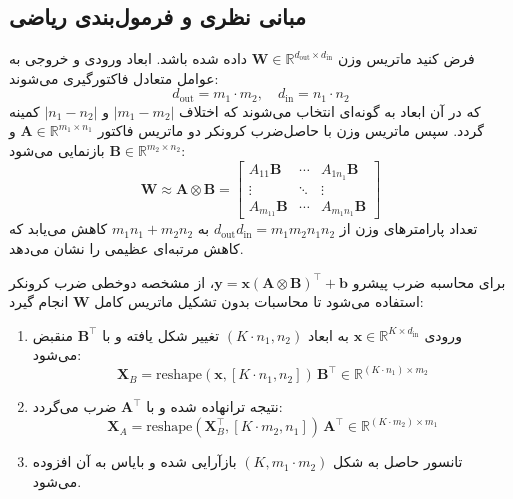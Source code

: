 \subsection{مبانی نظری و فرمول‌بندی ریاضی}
فرض کنید ماتریس وزن $\mathbf{W} \in \mathbb{R}^{d_{\text{out}} \times d_{\text{in}}}$ داده شده باشد. ابعاد ورودی و خروجی به عوامل متعادل فاکتورگیری می‌شوند:
\begin{equation}
d_{\text{out}} = m_1 \cdot m_2, \quad d_{\text{in}} = n_1 \cdot n_2
\end{equation}
که در آن ابعاد به گونه‌ای انتخاب می‌شوند که اختلاف $|m_1 - m_2|$ و $|n_1 - n_2|$ کمینه گردد. سپس ماتریس وزن با حاصل‌ضرب کرونکر دو ماتریس فاکتور $\mathbf{A} \in \mathbb{R}^{m_1 \times n_1}$ و $\mathbf{B} \in \mathbb{R}^{m_2 \times n_2}$ بازنمایی می‌شود:
\begin{equation}
\mathbf{W} \approx \mathbf{A} \otimes \mathbf{B} = \begin{bmatrix} 
A_{11}\mathbf{B} & \cdots & A_{1n_1}\mathbf{B} \\ 
\vdots & \ddots & \vdots \\ 
A_{m_11}\mathbf{B} & \cdots & A_{m_1n_1}\mathbf{B} 
\end{bmatrix}
\end{equation}
تعداد پارامترهای وزن از $d_{\text{out}} d_{\text{in}} = m_1 m_2 n_1 n_2$ به $m_1 n_1 + m_2 n_2$ کاهش می‌یابد که کاهش مرتبه‌ای عظیمی را نشان می‌دهد.

برای محاسبه ضرب پیشرو $\mathbf{y} = \mathbf{x} (\mathbf{A} \otimes \mathbf{B})^\top + \mathbf{b}$، از مشخصه دوخطی ضرب کرونکر استفاده می‌شود تا محاسبات بدون تشکیل ماتریس کامل $\mathbf{W}$ انجام گیرد:
\begin{enumerate}
    \item ورودی $\mathbf{x} \in \mathbb{R}^{K \times d_{\text{in}}}$ به ابعاد $(K \cdot n_1, n_2)$ تغییر شکل یافته و با $\mathbf{B}^\top$ منقبض می‌شود:
    \begin{equation}
    \mathbf{X}_B = \text{reshape}(\mathbf{x}, [K \cdot n_1, n_2]) \, \mathbf{B}^\top \in \mathbb{R}^{(K \cdot n_1) \times m_2}
    \end{equation}
    \item نتیجه ترانهاده شده و با $\mathbf{A}^\top$ ضرب می‌گردد:
    \begin{equation}
    \mathbf{X}_A = \text{reshape}(\mathbf{X}_B^\top, [K \cdot m_2, n_1]) \, \mathbf{A}^\top \in \mathbb{R}^{(K \cdot m_2) \times m_1}
    \end{equation}
    \item تانسور حاصل به شکل $(K, m_1 \cdot m_2)$ بازآرایی شده و بایاس به آن افزوده می‌شود.
\end{enumerate}

